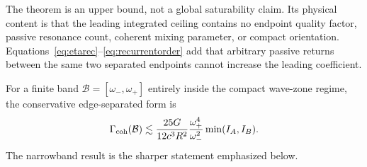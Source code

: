 The theorem is an upper bound, not a global saturability claim. Its physical content is that the leading integrated ceiling contains no endpoint quality factor, passive resonance count, coherent mixing parameter, or compact orientation. Equations~\eqref{eq:etarec}--\eqref{eq:recurrentorder} add that arbitrary passive returns between the same two separated endpoints cannot increase the leading coefficient.

For a finite band $\mathcal B=[\omega_-,\omega_+]$ entirely inside the compact wave-zone regime, the conservative edge-separated form is
\begin{equation}
\Gamma_{\rm coh}(\mathcal B)
\lesssim
\frac{25G}{12c^3R^2}
\frac{\omega_+^4}{\omega_-^2}
\min(I_A,I_B).
\label{eq:broadband}
\end{equation}
The narrowband result is the sharper statement emphasized below.